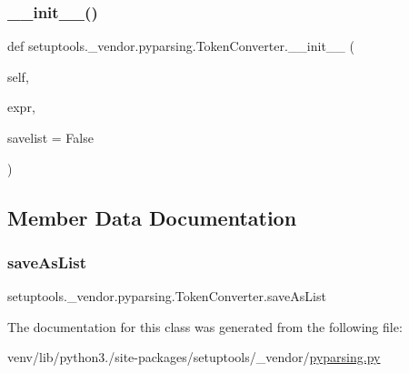 \subsubsection{\texorpdfstring{\+\_\+\+\_\+init\+\_\+\+\_\+()}{\_\_init\_\_()}}
{\footnotesize\ttfamily def setuptools.\+\_\+vendor.\+pyparsing.\+Token\+Converter.\+\_\+\+\_\+init\+\_\+\+\_\+ (\begin{DoxyParamCaption}\item[{}]{self,  }\item[{}]{expr,  }\item[{}]{savelist = {\ttfamily False} }\end{DoxyParamCaption})}



\subsection{Member Data Documentation}
\mbox{\label{classsetuptools_1_1__vendor_1_1pyparsing_1_1TokenConverter_a78379695505b245d7aba12470923d760}} 
\subsubsection{\texorpdfstring{save\+As\+List}{saveAsList}}
{\footnotesize\ttfamily setuptools.\+\_\+vendor.\+pyparsing.\+Token\+Converter.\+save\+As\+List}



The documentation for this class was generated from the following file\+:\begin{DoxyCompactItemize}
\item 
venv/lib/python3./site-\/packages/setuptools/\+\_\+vendor/\hyperlink{setuptools_2__vendor_2pyparsing_8py}{pyparsing.\+py}\end{DoxyCompactItemize}

